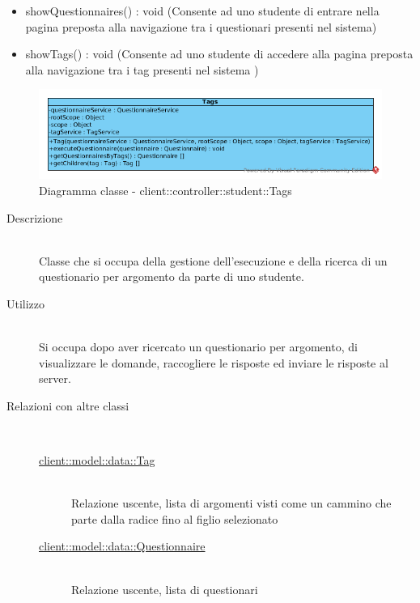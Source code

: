\begin{description}
\begin{itemize}
\item showQuestionnaires() : void (Consente ad uno studente di entrare nella pagina preposta alla navigazione tra i questionari presenti nel sistema)
\item showTags() : void (Consente ad uno studente di accedere alla pagina preposta alla navigazione tra i tag presenti nel sistema )
\end{itemize}

\end{description}

\vspace{0.5cm}
\hypertarget{client::controller::student::Tags}{}
\begin{center}
			\begin{figure}[H]
				\centering \includegraphics[scale=4, max width=\textwidth, max height=\myheight]{../img/diagrammiClassi/client/controller/student/Tags.png}
				\caption{Diagramma classe - client::controller::student::Tags}
			\end{figure}
		\end{center}\begin{description}
\item[Descrizione] \hfill \\
 Classe che si occupa della gestione dell'esecuzione e della ricerca di  un questionario per argomento da parte di uno studente.
\item[Utilizzo] \hfill \\
 Si occupa dopo aver ricercato un questionario per argomento, di visualizzare le domande, raccogliere le risposte ed inviare le risposte al server.
\item[Relazioni con altre classi] \hfill \\
 \vspace{-7mm}
\begin{description}
\item[\hyperlink{client::model::data::Tag}{client::model::data::Tag}] \hfill \\
 Relazione uscente, lista di argomenti visti come un cammino che parte dalla radice fino al figlio selezionato
\item[\hyperlink{client::model::data::Questionnaire}{client::model::data::Questionnaire}] \hfill \\
 Relazione uscente, lista di questionari
\end{description}


\end{description}
